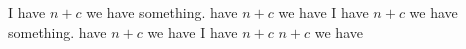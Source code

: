 \documentclass{article}
\begin{document}
I have $n + c$ we have something. have $n + c$ we have
I have $n + c$ we have something. have $n + c$ we have
I have $n + c$ $n + c$ we have
\end{document}
